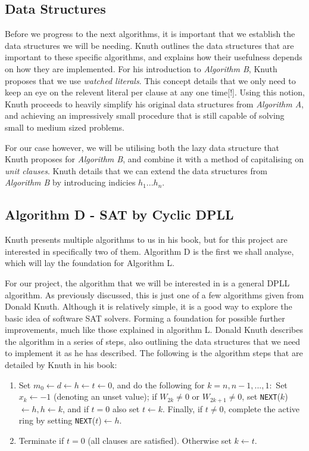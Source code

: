 \documentclass{article}
\begin{document}
\subsection{Data Structures}
Before we progress to the next algorithms, it is important that we establish the data structures we will be needing. Knuth
outlines the data structures that are important to these specific algorithms, and explains how their usefulness depends on how
they are implemented. For his introduction to \textit{Algorithm B}, Knuth proposes that we use \textit{watched literals}. This
concept details that we only need to keep an eye on the relevent literal per clause at any one time[!]. Using this notion, Knuth
proceeds to heavily simplify his original data structures from \textit{Algorithm A}, and achieving an impressively small
procedure that is still capable of solving small to medium sized problems.

For our case however, we will be utilising both the lazy data structure that Knuth proposes for \textit{Algorithm B}, and combine
it with a method of capitalising on \textit{unit clauses}. Knuth details that we can extend the data structures from \textit{Algorithm B} by introducing indicies $h_1...h_n$.


\subsection{Algorithm D - SAT by Cyclic DPLL}
Knuth presents multiple algorithms to us in his book, but for this project are interested in specifically two of them. Algorithm D
is the first we shall analyse, which will lay the foundation for Algorithm L.

For our project, the algorithm that we will be interested in is a general DPLL algorithm. As
previously discussed, this is just one of a few algorithms given from Donald Knuth. Although it is
relatively simple, it is a good way to explore the basic idea of software SAT solvers. Forming a
foundation for possible further improvements, much like those explained in algorithm L. Donald Knuth
describes the algorithm in a series of steps, also outlining the data structures that we need to
implement it as he has described. The following is the algorithm steps that are detailed by Knuth in his book:

\begin{enumerate}
    \item Set $m_0 \leftarrow d \leftarrow h \leftarrow t \leftarrow 0$, and do the following for $k = n, n - 1, ..., 1:$ Set $x_k ← -1$ (denoting an unset value); if $W_{2k} \neq 0$ or $W_{2k+1} \neq 0$, set \texttt{NEXT}($k$) $ \leftarrow h, h \leftarrow k$, and if $t = 0$ also set $t \leftarrow k$. Finally, if $t \neq 0$, complete the active ring by setting \texttt{NEXT}($t$)$ \leftarrow h$.
    \item Terminate if $t = 0$ (all clauses are satisfied). Otherwise set $k \leftarrow t$.
\end{enumerate}
\end{document}

